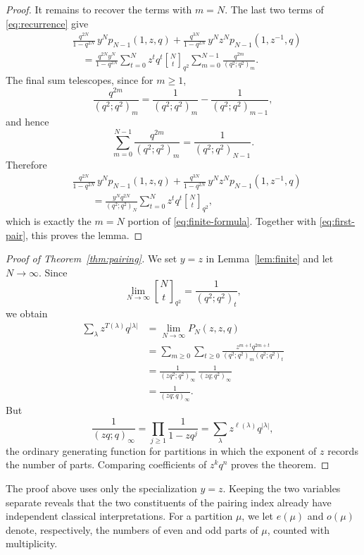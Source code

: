 \documentclass[11pt]{article}
\theoremstyle{definition}
\theoremstyle{remark}
\newcommand{\qbinom}[3][]{%
  \genfrac{[}{]}{0pt}{}{#2}{#3}_{#1}%
}
\begin{document}
\begin{proof}
It remains to recover the terms with $m=N$.  The last two terms of \eqref{eq:recurrence} give
\begin{align*}
 &\frac{q^{2N}}{1-q^{2N}}\,y^Np_{N-1}(1,z,q)
 +\frac{q^{3N}}{1-q^{2N}}\,y^Nz^Np_{N-1}(1,z^{-1},q)\\
 &\quad=
 \frac{q^{2N}y^N}{1-q^{2N}}
 \sum_{t=0}^{N}z^tq^t\qbinom[q^2]{N}{t}
 \sum_{m=0}^{N-1}\frac{q^{2m}}{(q^2;q^2)_m}.
\end{align*}
The final sum telescopes, since for $m\ge1$,
\[
 \frac{q^{2m}}{(q^2;q^2)_m}
 =\frac{1}{(q^2;q^2)_m}-\frac{1}{(q^2;q^2)_{m-1}},
\]
and hence
\[
 \sum_{m=0}^{N-1}\frac{q^{2m}}{(q^2;q^2)_m}
 =\frac{1}{(q^2;q^2)_{N-1}}.
\]
Therefore
\begin{align*}
 &\frac{q^{2N}}{1-q^{2N}}\,y^Np_{N-1}(1,z,q)
 +\frac{q^{3N}}{1-q^{2N}}\,y^Nz^Np_{N-1}(1,z^{-1},q)\\
 &\qquad=
 \frac{y^Nq^{2N}}{(q^2;q^2)_N}
 \sum_{t=0}^{N}z^tq^t\qbinom[q^2]{N}{t},
\end{align*}
which is exactly the $m=N$ portion of \eqref{eq:finite-formula}.  Together with \eqref{eq:first-pair}, this proves the lemma.
\end{proof}

\begin{proof}[Proof of Theorem~\ref{thm:pairing}]
We set $y=z$ in Lemma~\ref{lem:finite} and let $N\to\infty$.  Since
\[
 \lim_{N\to\infty}\qbinom[q^2]{N}{t}
 =\frac{1}{(q^2;q^2)_t},
\]
we obtain
\begin{align*}
 \sum_{\lambda}z^{T(\lambda)}q^{|\lambda|}
 &=\lim_{N\to\infty}P_N(z,z,q)\\
 &=\sum_{m\ge0}\sum_{t\ge0}
 \frac{z^{m+t}q^{2m+t}}
 {(q^2;q^2)_m(q^2;q^2)_t}\\
 &=\frac{1}{(zq^2;q^2)_\infty}\,
   \frac{1}{(zq;q^2)_\infty}\\
 &=\frac{1}{(zq;q)_\infty}.
\end{align*}
But
\[
 \frac{1}{(zq;q)_\infty}
 =\prod_{j\ge1}\frac{1}{1-zq^j}
 =\sum_{\lambda}z^{\ell(\lambda)}q^{|\lambda|},
\]
the ordinary generating function for partitions in which the exponent of $z$ records the number of parts.  Comparing coefficients of $z^kq^n$ proves the theorem.
\end{proof}

The proof above uses only the specialization $y=z$.  Keeping the two
variables separate reveals that the two constituents of the pairing index
already have independent classical interpretations.  For a partition $\mu$,
we let $e(\mu)$ and $o(\mu)$ denote, respectively, the numbers of even and odd
parts of $\mu$, counted with multiplicity.
\end{document}
